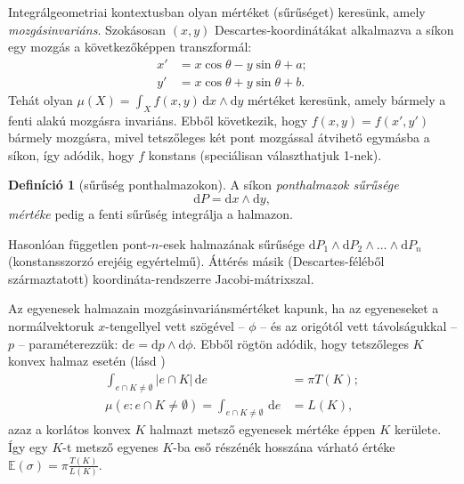 \documentclass[%
	DIV=15,appendixprefix]{scrreprt}
\theoremstyle{definition}
\newtheorem*{defin}{Definíció}
\theoremstyle{remark}
\newcommand{\mean}{\mathbb{E}}
\begin{document}
Integrálgeometriai kontextusban olyan mértéket (sűrűséget) keresünk, amely \emph{mozgásinvariáns}.
Szokásosan $ \left( x,{} y \right) $ Descartes-koordinátákat alkalmazva a síkon egy mozgás a
következőképpen transzformál:
\begin{align*}
	x' &= x \cos \theta - y \sin \theta + a;\\
	y' &= x \cos \theta + y \sin \theta + b.
\end{align*}
Tehát olyan $ \mu \left( X \right) = \int_{ X } f \left( x,{} y \right) \, \mathrm{ d }x \wedge
\mathrm{ d } y $ mértéket keresünk, amely bármely a fenti alakú mozgásra invariáns. Ebből
következik, hogy $ f \left(
x,{} y \right) = f \left( x',{} y' \right) $ bármely mozgásra, mivel tetszőleges két pont mozgással
átvihető egymásba a síkon, így adódik, hogy $ f $ konstans (speciálisan választhatjuk 1-nek).
\begin{defin}[sűrűség ponthalmazokon]
	A síkon \emph{ponthalmazok sűrűsége}
	\begin{equation*}
		\mathrm{ d } P =  \mathrm{ d }x \wedge \mathrm{ d } y,
	\end{equation*}
	\emph{mértéke} pedig a fenti sűrűség integrálja a halmazon.
\end{defin}
Hasonlóan független pont-$ n $-esek halmazának sűrűsége $ \mathrm{ d } P_{ 1 } \wedge \mathrm{ d }
P_{ 2 } \wedge \ldots \wedge \mathrm{ d } P_{ n } $ (konstansszorzó erejéig egyértelmű). Áttérés
másik (Descartes-féléből származtatott) koordináta-rendszerre Jacobi-mátrixszal.

Az egyenesek halmazain mozgásinvariánsmértéket kapunk, ha az egyeneseket a
normálvektoruk $ x $-tengellyel vett szögével -- $ \phi $ -- és az origótól vett távolságukkal
-- $ p $ -- paraméterezzük: $ \mathrm{ d } e =  \mathrm{ d }p \wedge \mathrm{ d } \phi $. Ebből
rögtön adódik, hogy tetszőleges $ K $ konvex halmaz esetén (lásd \cite[29--30.~oldal]{Santalo})
\begin{align*}
	\int_{ e \cap K \neq \emptyset } \left| e \cap K \right| \, \mathrm{ d } e &= \pi T \left( K
	\right);\\
	\mu \left( e \colon e \cap K \neq \emptyset \right) = \int_{ e \cap K \neq \emptyset } \,
	\mathrm{ d } e &= L \left( K \right),
\end{align*}
azaz a korlátos konvex $ K $ halmazt metsző egyenesek mértéke éppen $ K $ kerülete. Így egy $ K $-t
metsző egyenes $ K $-ba eső részénék hosszána várható értéke $ \mean \left( \sigma \right)  = \pi
\frac{ T \left( K \right) }{ L \left( K  \right) } $.
\end{document}
